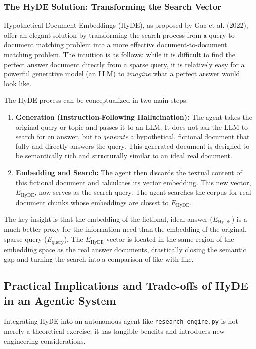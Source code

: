 \documentclass[12pt, a4paper]{article}
\begin{document}
\subsubsection{The HyDE Solution: Transforming the Search Vector}
Hypothetical Document Embeddings (HyDE), as proposed by Gao et al. (2022), offer an elegant solution by transforming the search process from a query-to-document matching problem into a more effective document-to-document matching problem. The intuition is as follows: while it is difficult to find the perfect answer document directly from a sparse query, it is relatively easy for a powerful generative model (an LLM) to \textit{imagine} what a perfect answer would look like.

The HyDE process can be conceptualized in two main steps:

\begin{enumerate}
    \item \textbf{Generation (Instruction-Following Hallucination):} The agent takes the original query or topic and passes it to an LLM. It does not ask the LLM to search for an answer, but to \textit{generate} a hypothetical, fictional document that fully and directly answers the query. This generated document is designed to be semantically rich and structurally similar to an ideal real document.
    \item \textbf{Embedding and Search:} The agent then discards the textual content of this fictional document and calculates its vector embedding. This new vector, $E_{\text{HyDE}}$, now serves as the search query. The agent searches the corpus for real document chunks whose embeddings are closest to $E_{\text{HyDE}}$.
\end{enumerate}

The key insight is that the embedding of the fictional, ideal answer ($E_{\text{HyDE}}$) is a much better proxy for the information need than the embedding of the original, sparse query ($E_{\text{query}}$). The $E_{\text{HyDE}}$ vector is located in the same region of the embedding space as the real answer documents, drastically closing the semantic gap and turning the search into a comparison of like-with-like.

\subsection{Practical Implications and Trade-offs of HyDE in an Agentic System}
Integrating HyDE into an autonomous agent like \verb|research_engine.py| is not merely a theoretical exercise; it has tangible benefits and introduces new engineering considerations.
\end{document}
